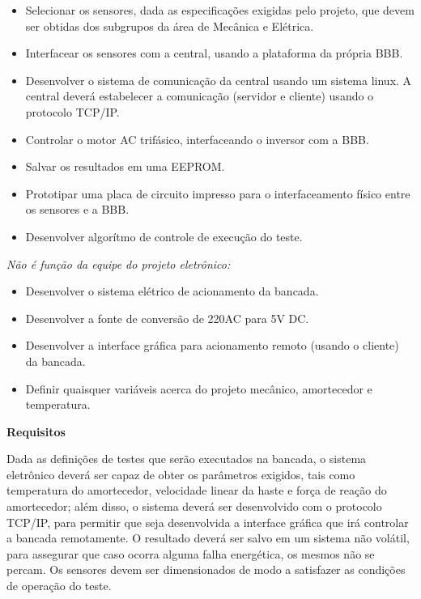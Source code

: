 	\begin{itemize}

	\item Selecionar os sensores, dada as especificações exigidas pelo projeto, que devem ser obtidas dos subgrupos da área de Mecânica e Elétrica.
	\item Interfacear os sensores com a central, usando a plataforma da própria BBB.
	\item Desenvolver o sistema de comunicação da central usando um sistema linux. A central deverá estabelecer a comunicação (servidor e cliente) usando o protocolo TCP/IP.
	\item Controlar o motor AC trifásico, interfaceando o inversor com a BBB.
	\item Salvar os resultados em uma EEPROM.
	\item Prototipar uma placa de circuito impresso para o interfaceamento físico entre os sensores e a BBB.
	\item Desenvolver algorítmo de controle de execução do teste.

	\end{itemize}

	\textit{ Não é função da equipe do projeto eletrônico:}

	\begin{itemize}

	\item Desenvolver o sistema elétrico de acionamento da bancada.
	\item Desenvolver a fonte de conversão de 220AC para 5V DC.
	\item Desenvolver a interface gráfica para acionamento remoto (usando o cliente) da bancada.
	\item Definir quaisquer variáveis acerca do projeto mecânico, amortecedor e temperatura.

	\end{itemize}

	\textbf{Requisitos}

	Dada as definições de testes que serão executados na bancada, o sistema eletrônico deverá ser capaz de obter os parâmetros exigidos, tais como temperatura do amortecedor, velocidade linear da haste e força de reação do amortecedor; além disso, o sistema deverá ser desenvolvido com o protocolo TCP/IP, para permitir que seja desenvolvida a interface gráfica que irá controlar a bancada remotamente. O resultado deverá ser salvo em um sistema não volátil, para assegurar que caso ocorra alguma falha energética, os mesmos não se percam. Os sensores devem ser dimensionados de modo a satisfazer as condições de operação do teste. 

